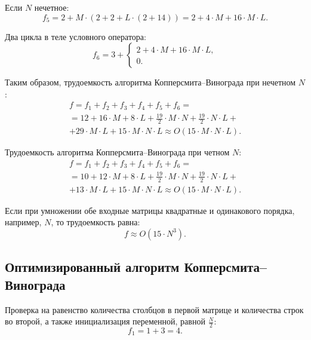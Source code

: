 Если $N$ нечетное:
\begin{equation}
f_5 = 2 + M \cdot (2 + 2 + L \cdot (2 + 14)) = 2 + 4 \cdot M + 16 \cdot M \cdot L.
\end{equation}

Два цикла в теле условного оператора:
\begin{equation}
f_6 = 3 +
	\begin{cases}
    2 + 4 \cdot M + 16 \cdot M \cdot L, \\
    0.
    \end{cases}
\end{equation}

Таким образом, трудоемкость алгоритма Копперсмита--Винограда при нечетном $N$:
\begin{equation}
\begin{gathered}
f = f_1 + f_2 + f_3 + f_4 + f_5 + f_6 = \\ = 12 + 16 \cdot M + 8 \cdot L + \frac{19}{2} \cdot M \cdot N + \frac{19}{2} \cdot N \cdot L + \\ + 29 \cdot M \cdot L + 15 \cdot M \cdot N \cdot L \approx O(15 \cdot M \cdot N \cdot L).
\end{gathered}
\end{equation}

Трудоемкость алгоритма Копперсмита--Винограда при четном $N$:
\begin{equation}
\begin{gathered}
f = f_1 + f_2 + f_3 + f_4 + f_5 + f_6 = \\ = 10 + 12 \cdot M + 8 \cdot L + \frac{19}{2} \cdot M \cdot N + \frac{19}{2} \cdot N \cdot L + \\ + 13 \cdot M \cdot L + 15 \cdot M \cdot N \cdot L \approx O(15 \cdot M \cdot N \cdot L).
\end{gathered}
\end{equation}

Если при умножении обе входные матрицы квадратные и одинакового порядка, например, $N$, то трудоемкость равна:
\begin{equation}
f \approx O(15 \cdot N^3).
\end{equation}

\subsection{Оптимизированный алгоритм Копперсмита--Винограда}

Проверка на равенство количества столбцов в первой матрице и количества строк во второй, а также инициализация переменной, равной $\frac{N}{2}$:
\begin{equation}
f_1 = 1 + 3 = 4.
\end{equation}

